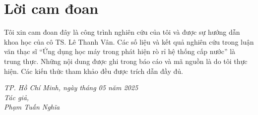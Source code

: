 \chapter*{Lời cam đoan}
Tôi xin cam đoan đây là công trình nghiên cứu của tôi và được sự hướng dẫn khoa học của cô TS. Lê Thanh Vân. Các số liệu và kết quả nghiên cứu trong luận văn thạc sĩ ``Ứng dụng học máy trong phát hiện rò rỉ hệ thống cấp nước'' là trung thực. Những nội dung được ghi trong báo cáo và mã nguồn là do tôi thực hiện. Các kiến thức tham khảo đều được trích dẫn đầy đủ.
\begin{flushright}
\textit{
TP. Hồ Chí Minh, ngày    tháng 05 năm 2025\\
Tác giả,\\
Phạm Tuấn Nghĩa
}
\end{flushright}